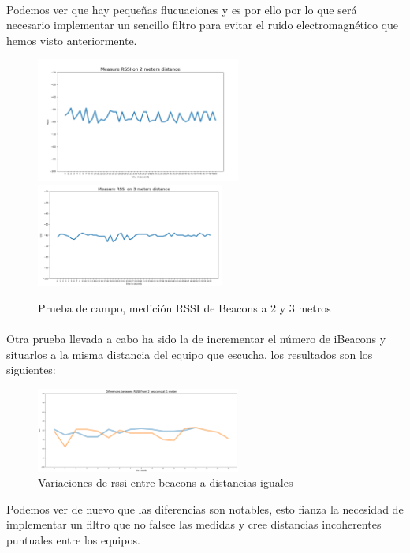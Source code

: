 \documentclass[a4paper ,12pt, onecolumn]{article}
\begin{document}
            \paragraph{}
            Podemos ver que hay pequeñas flucuaciones y es por ello por lo que será necesario implementar un sencillo filtro para
            evitar el ruido electromagnético que hemos visto anteriormente.
            \begin{center}
                \begin{figure}[ht]
                    \centering
                    \includegraphics[width=0.6\textwidth]{1_beacon_2_meters.PNG}
                    \includegraphics[width=0.55\textwidth]{1_beacon_3_meters.PNG}
                    \caption{Prueba de campo, medición RSSI de Beacons a 2 y 3 metros}
                    \label{fig:mesh5}
                \end{figure}
            \end{center}
            \paragraph{}
            Otra prueba llevada a cabo ha sido la de incrementar el número de iBeacons y situarlos a la misma distancia del 
            equipo que escucha, los resultados son los siguientes:
            \begin{center}
                \begin{figure}[ht]
                    \centering
                    \includegraphics[width=0.6\textwidth]{10min_2beacons_same_distance.PNG}
                    \caption{Variaciones de rssi entre beacons a distancias iguales}
                    \label{fig:mesh6}
                \end{figure}
            \end{center}
            Podemos ver de nuevo que las diferencias son notables, esto fianza la necesidad de implementar
            un filtro que no falsee las medidas y cree distancias incoherentes puntuales entre los equipos.
\end{document}
